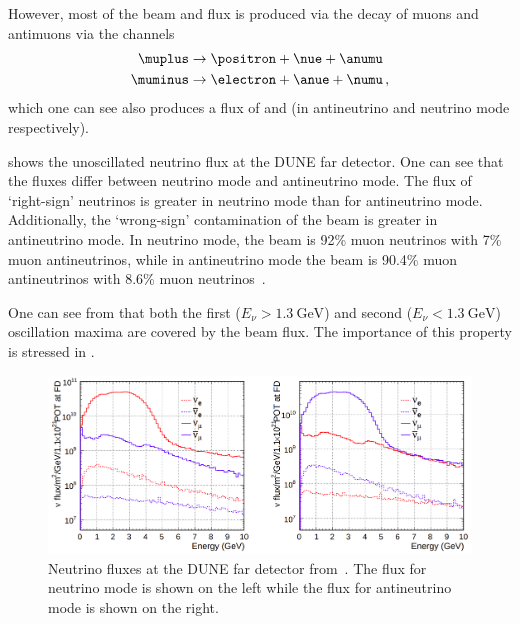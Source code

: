 However, most of the beam \nue and \anue flux is produced via the decay of muons and antimuons via the channels
\begin{align}
  \muplus &\rightarrow \positron + \nue + \anumu \\
  \muminus &\rightarrow \electron + \anue + \numu \, ,
\end{align}
which one can see also produces a flux of \numu and \anumu (in antineutrino and neutrino mode respectively).

 shows the unoscillated neutrino flux at the DUNE far detector.
One can see that the fluxes differ between neutrino mode and antineutrino mode.
The flux of `right-sign' neutrinos is greater in neutrino mode than for antineutrino mode.
Additionally, the `wrong-sign' contamination of the beam is greater in antineutrino mode.
In neutrino mode, the beam is 92\% muon neutrinos with 7\% muon antineutrinos, while in antineutrino mode the beam is 90.4\% muon antineutrinos with 8.6\% muon neutrinos~\cite{tdrVol2}.

One can see from  that both the first ($E_{\nu} > \SI{1.3}{\giga\electronvolt}$) and second ($E_{\nu} < \SI{1.3}{\giga\electronvolt}$) oscillation maxima are covered by the beam flux.
The importance of this property is stressed in .

\begin{figure}[h]
  \centering
  \includegraphics[width=.95\linewidth]{files/figures/dune_detector/duneFDFlux}
  \caption[Neutrino fluxes at the DUNE far detector.]{Neutrino fluxes at the DUNE far detector from~\cite{tdrVol2}. The flux for neutrino mode is shown on the left while the flux for antineutrino mode is shown on the right.}
  \label{fig:fdFlux}
\end{figure}

